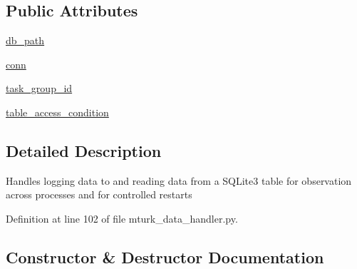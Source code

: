 \subsection*{Public Attributes}
\begin{DoxyCompactItemize}
\item 
\hyperlink{classparlai_1_1mturk_1_1core_1_1dev_1_1mturk__data__handler_1_1MTurkDataHandler_a7cca153268ab042892a68ad4aa032414}{db\+\_\+path}
\item 
\hyperlink{classparlai_1_1mturk_1_1core_1_1dev_1_1mturk__data__handler_1_1MTurkDataHandler_a66361d334cabae5782ca8a8740b32e95}{conn}
\item 
\hyperlink{classparlai_1_1mturk_1_1core_1_1dev_1_1mturk__data__handler_1_1MTurkDataHandler_af4bebaca067ce2d388fe76ee8859e1bd}{task\+\_\+group\+\_\+id}
\item 
\hyperlink{classparlai_1_1mturk_1_1core_1_1dev_1_1mturk__data__handler_1_1MTurkDataHandler_a782fb3d819b27356b34060bc3b9f110e}{table\+\_\+access\+\_\+condition}
\end{DoxyCompactItemize}


\subsection{Detailed Description}
\begin{DoxyVerb}Handles logging data to and reading data from a SQLite3 table for
observation across processes and for controlled restarts
\end{DoxyVerb}
 

Definition at line 102 of file mturk\+\_\+data\+\_\+handler.\+py.



\subsection{Constructor \& Destructor Documentation}
\mbox{\label{classparlai_1_1mturk_1_1core_1_1dev_1_1mturk__data__handler_1_1MTurkDataHandler_ac6706c58fc7fc4f76a8d92e55c4d64df}} 
